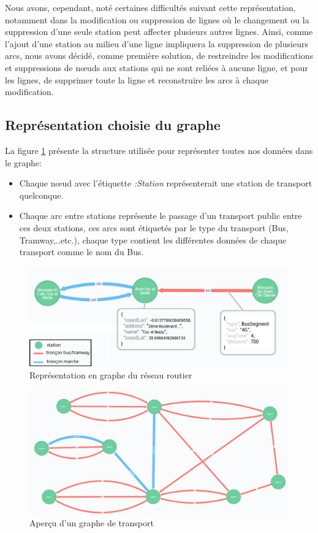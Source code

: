 \begin{itemize}
	Nous avons, cependant, noté certaines difficultés suivant cette représentation, notamment dans la modification ou suppression de lignes où le changement ou la suppression d'une seule station peut affecter plusieurs autres lignes.\newline
	Ainsi, comme l'ajout d'une station au milieu d'une ligne impliquera la suppression de plusieurs arcs, nous avons décidé, comme première solution, de restreindre les modifications et suppressions de nœuds aux stations qui ne sont reliées à aucune ligne, et pour les lignes, de supprimer toute la ligne et reconstruire les arcs à chaque modification.
	     
\end{itemize}
\subsection{Représentation choisie du graphe}
La figure \ref{fig:structGraph} présente la structure utilisée pour représenter toutes nos données dans le graphe:
\begin{itemize}
	\item Chaque nœud avec l'étiquette \emph{:Station} représenterait une station de transport quelconque.
	\item Chaque arc entre stations représente le passage d'un transport public entre ces deux stations, ces arcs sont étiquetés par le type du transport (Bus, Tramway,..etc.), chaque type contient les différentes données de chaque transport comme le nom du Bus.
\end{itemize}

\begin{figure}[h!]
	\center
	\includegraphics[width=\textwidth]{img/structureGraphe.png}
	\caption{Représentation en graphe du réseau routier}
	\label{fig:structGraph}
\end{figure}

\begin{figure}[h!]
	\center
	\includegraphics[width=1.1\textwidth]{img/GrapheNeo4j.png}
	\caption{Aperçu d'un graphe de transport}
	\label{fig:transportGraph}
\end{figure}


